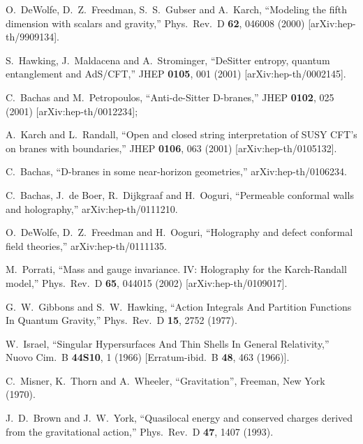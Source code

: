 \documentclass[a4paper,12pt,oneside]{article}
\begin{document}
\begin{thebibliography}{99}
O.~DeWolfe, D.~Z.~Freedman, S.~S.~Gubser and A.~Karch,
``Modeling the fifth dimension with scalars and gravity,''
Phys.\ Rev.\ D {\bf 62}, 046008 (2000)
[arXiv:hep-th/9909134].


S.~Hawking, J.~Maldacena and A.~Strominger,
``DeSitter entropy, quantum entanglement and AdS/CFT,''
JHEP {\bf 0105}, 001 (2001)
[arXiv:hep-th/0002145].


C.~Bachas and M.~Petropoulos,
``Anti-de-Sitter D-branes,''
JHEP {\bf 0102}, 025 (2001)
[arXiv:hep-th/0012234]; 


A.~Karch and L.~Randall,
``Open and closed string interpretation
 of SUSY CFT's on branes with  boundaries,''
JHEP {\bf 0106}, 063 (2001)
[arXiv:hep-th/0105132].

 C.~Bachas,
``D-branes in some near-horizon geometries,''
arXiv:hep-th/0106234.


C.~Bachas, J.~de Boer, R.~Dijkgraaf and H.~Ooguri,
``Permeable conformal walls and holography,''
arXiv:hep-th/0111210.

O.~DeWolfe, D.~Z.~Freedman and H.~Ooguri,
``Holography and defect conformal field theories,''
arXiv:hep-th/0111135.

M.~Porrati,
``Mass and gauge invariance. IV: Holography for the Karch-Randall model,''
Phys.\ Rev.\ D {\bf 65}, 044015 (2002)
[arXiv:hep-th/0109017].


G.~W.~Gibbons and S.~W.~Hawking,
``Action Integrals And Partition Functions In Quantum Gravity,''
Phys.\ Rev.\ D {\bf 15}, 2752 (1977).

W.~Israel,
``Singular Hypersurfaces And Thin Shells In General Relativity,''
Nuovo Cim.\ B {\bf 44S10}, 1 (1966)
[Erratum-ibid.\ B {\bf 48}, 463 (1966)].


 C.~Misner, K.~Thorn and A.~Wheeler,
``Gravitation'', Freeman, New York (1970).

J.~D.~Brown and J.~W.~York,
``Quasilocal energy and conserved charges
 derived from the gravitational action,''
Phys.\ Rev.\ D {\bf 47}, 1407 (1993).


\end{thebibliography}
\end{document}
